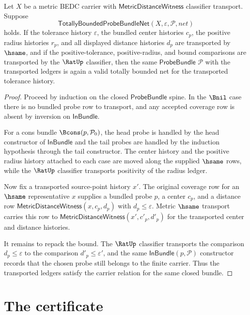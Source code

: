 \begin{theorem}
\label{thm:totallybounded-probebundle-net-coverage-stability}
Let $X$ be a metric BEDC carrier with $\mathsf{MetricDistanceWitness}$
classifier transport. Suppose
$$
\mathsf{TotallyBoundedProbeBundleNet}(X,\varepsilon,\mathcal{P},net)
$$
holds. If the tolerance history $\varepsilon$, the bundled center histories
$c_p$, the positive radius histories $r_p$, and all displayed distance
histories $d_p$ are transported by $\hsame$, and if the positive-tolerance,
positive-radius, and bound comparisons are transported by the $\RatUp$
classifier, then the same $\mathsf{ProbeBundle}$ $\mathcal{P}$ with the
transported ledgers is again a valid totally bounded net for the transported
tolerance history.
\end{theorem}
\begin{proof}
Proceed by induction on the closed $\mathsf{ProbeBundle}$ spine. In the
$\Bnil$ case there is no bundled probe row to transport, and any accepted
coverage row is absent by inversion on $\mathsf{InBundle}$.

For a cons bundle $\Bcons(p,\mathcal{P}_0)$, the head probe is handled by the
head constructor of $\mathsf{InBundle}$ and the tail probes are handled by the
induction hypothesis through the tail constructor. The center history and the
positive radius history attached to each case are moved along the supplied
$\hsame$ rows, while the $\RatUp$ classifier transports positivity of the
radius ledger.

Now fix a transported source-point history $x'$. The original coverage row for
an $\hsame$ representative $x$ supplies a bundled probe $p$, a center $c_p$,
and a distance row $\mathsf{MetricDistanceWitness}(x,c_p,d_p)$ with
$d_p \leq \varepsilon$. Metric $\hsame$ transport carries this row to
$\mathsf{MetricDistanceWitness}(x',c'_p,d'_p)$ for the transported center and
distance histories.

It remains to repack the bound. The $\RatUp$ classifier transports the
comparison $d_p \leq \varepsilon$ to the comparison
$d'_p \leq \varepsilon'$, and the same $\mathsf{InBundle}(p,\mathcal{P})$
constructor records that the chosen probe still belongs to the finite carrier.
Thus the transported ledgers satisfy the carrier relation for the same closed
bundle.
\end{proof}

\section{The certificate}
\label{sec:totallybounded-certificate}

